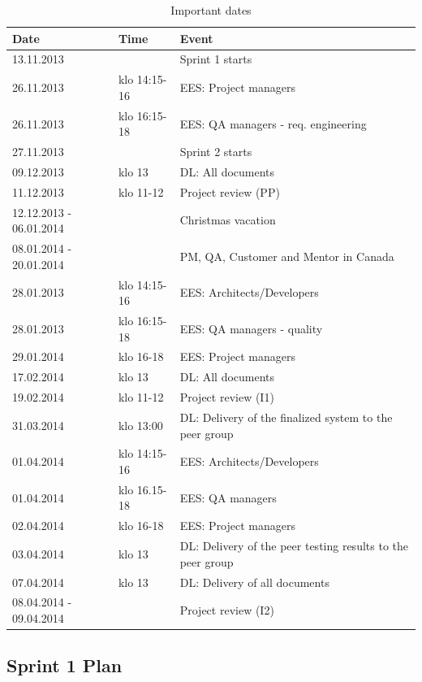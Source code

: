 \begin{table}[H]
\center
\begin{tabular}{|p{2cm}|p{3.8cm}|p{4.1cm}|} 
	
\hline 
\textbf{Date} & \textbf{Time} & \textbf{Event}\\ 
\hline
13.11.2013 &  &  Sprint 1 starts \\
\hline
26.11.2013 & klo 14:15-16 &  EES: Project managers \\
\hline
26.11.2013 & klo 16:15-18 &  EES: QA managers - req. engineering \\
\hline
27.11.2013 &  &  Sprint 2 starts \\
\hline
09.12.2013 & klo 13 &  DL: All documents \\
\hline
11.12.2013 & klo 11-12 & Project review (PP) \\
\hline
12.12.2013 - 06.01.2014 &  &  Christmas vacation \\
\hline
08.01.2014 - 20.01.2014 &  &  PM, QA, Customer and Mentor in Canada \\
\hline
28.01.2013 & klo 14:15-16 &  EES: Architects/Developers \\
\hline
28.01.2013 & klo 16:15-18 & EES: QA managers - quality \\
\hline
29.01.2014 & klo 16-18 &  EES: Project managers \\
\hline
17.02.2014 & klo 13 &  DL: All documents \\
\hline
19.02.2014 & klo 11-12 & Project review (I1) \\
\hline
31.03.2014 & klo 13:00 &  DL: Delivery of the finalized system to the peer
group\\
\hline
01.04.2014 & klo 14:15-16 & EES: Architects/Developers \\
\hline
01.04.2014 & klo 16.15-18 & EES: QA managers  \\
\hline
02.04.2014 & klo 16-18 &  EES: Project managers\\
\hline
03.04.2014 & klo 13 & DL: Delivery of the peer testing results to the peer group
\\
\hline
07.04.2014 & klo 13 & DL: Delivery of all documents \\
\hline
08.04.2014 - 09.04.2014 &  & Project review (I2) \\
\hline
\end{tabular} 
\caption{Important dates}
\label{table:dates}
\end{table}

\subsection{Sprint 1 Plan}

